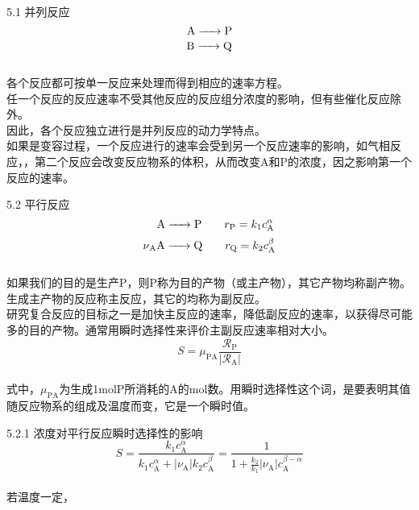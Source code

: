 \begin{frame}{5.1 并列反应}
	$$\ce{A ->P}$$
	$$\ce{B ->Q}$$
	\\各个反应都可按单一反应来处理而得到相应的速率方程。
	\\任一个反应的反应速率不受其他反应的反应组分浓度的影响，但有些催化反应除外。
	\\因此，各个反应独立进行是并列反应的动力学特点。
	\\如果是变容过程，一个反应进行的速率会受到另一个反应速率的影响，如气相反应，，第二个反应会改变反应物系的体积，从而改变A和P的浓度，因之影响第一个反应的速率。
\end{frame}


\begin{frame}{5.2 平行反应}
	$$~~~\ce{A ->P}\qquad r_\mathrm{P}=k_1c_\mathrm{A}^\alpha$$
	$$\ce{\nu_{A}A ->Q}\qquad r_\mathrm{Q}=k_2c_\mathrm{A}^\beta$$
	\\如果我们的目的是生产P，则P称为{\color{red}目的产物（或主产物）}，其它产物均称{\color{red}副产物}。生成主产物的反应称{\color{red}主反应}，其它的均称为{\color{red}副反应}。
	\\研究复合反应的目标之一是加快主反应的速率，降低副反应的速率，以获得尽可能多的目的产物。通常用{\color{red}瞬时选择性}来评价主副反应速率相对大小。
	$$S=\mu_\mathrm{PA}\frac{\mathscr{R}_\mathrm{P}}{|\mathscr{R}_\mathrm{A}|}$$
	\\式中，$\mu_\mathrm{PA}$为生成1molP所消耗的A的mol数。用瞬时选择性这个词，是要表明其值随反应物系的组成及温度而变，它是一个瞬时值。
\end{frame}


\begin{frame}{5.2.1 浓度对平行反应瞬时选择性的影响}
	$$S=\frac{k_1c_\mathrm{A}^\alpha}{k_1c_\mathrm{A}^\alpha+|{\nu_\mathrm{A}}|k_2c_\mathrm{A}^\beta}=\frac{1}{1+\frac{k_2}{k_1}|{\nu_\mathrm{A}}|c_\mathrm{A}^{\beta -\alpha}}$$
	\\若温度一定，
\end{frame}